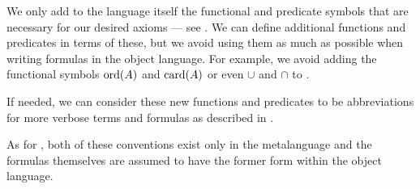 \begin{remark}
\begin{thmenum}
     We only add to the language itself the functional and predicate symbols that are necessary for our desired axioms --- see . We can define additional functions and predicates in terms of these, but we avoid using them as much as possible when writing formulas in the object language. For example, we avoid adding the functional symbols \hyperref[thm:well_ordered_order_type_existence]{\( \operatorname{ord}(A) \)} and \hyperref[def:cardinal]{\( \operatorname{card}(A) \)} or even \hyperref[def:basic_set_operations/union]{\( \cup \)} and \hyperref[def:basic_set_operations/intersection]{\( \cap \)} to \hyperref[def:zfc]{}.

    If needed, we can consider these new functions and predicates to be abbreviations for more verbose terms and formulas as described in .
  \end{thmenum}

  As for , both of these conventions exist only in the metalanguage and the formulas themselves are assumed to have the former form within the object language.
\end{remark}

